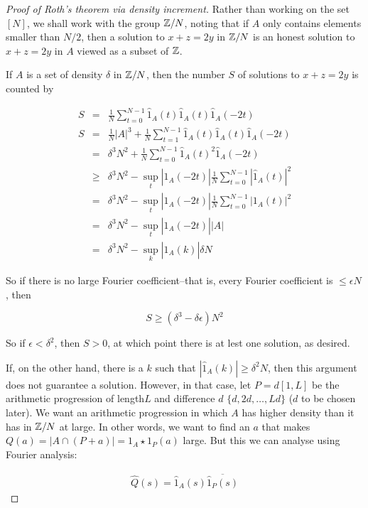 \documentclass{report}
\theoremstyle{remark}
\numberwithin{equation}{section}
\begin{document}
\begin{proof}[Proof of Roth's theorem via density increment]

  Rather than working on the set $[N]$, we shall work with the group
  $\mathbb{Z}/N$, noting that if $A$ only contains elements smaller than
  $N/2$, then a solution to $x+z=2y$ in $\mathbb{Z}/N$ is an honest solution
  to $x+z=2y$ in $A$ viewed as a subset of $\mathbb{Z}$.  

  If $A$ is a set of density $\delta$ in $\mathbb{Z}/N$, then the number $S$
  of solutions to $x+z=2y$ is counted by

  \begin{eqnarray*}
    S &=& \frac1N \sum_{t=0}^{N-1} \hat 1_A(t)\hat 1_A(t)\hat 1_A(-2t) \\
    S &=& \frac1N |A|^3 + \frac1N \sum_{t=1}^{N-1} \hat 1_A(t)\hat 1_A(t)\hat 1_A(-2t) \\
      &=& \delta^3 N^2 + \frac1N \sum_{t=0}^{N-1} \hat 1_A(t)^2\hat 1_A(-2t) \\
      &\geq& \delta^3 N^2 - \sup_t |\hat 1_A(-2t)| \frac1N \sum_{t=0}^{N-1} |\hat 1_A(t)|^2 \\
      &=& \delta^3 N^2 - \sup_t |\hat 1_A(-2t)| \frac1N \sum_{t=0}^{N-1} |1_A(t)|^2 \\
      &=& \delta^3 N^2 - \sup_t |\hat 1_A(-2t)| |A|\\
      &=& \delta^3 N^2 - \sup_k |\hat 1_A(k)| \delta N
  \end{eqnarray*}

  So if there is no large Fourier coefficient--that is, every Fourier
  coefficient is $\leq \epsilon N$, then
  
  \[S \geq (\delta^3 - \delta\epsilon) N^2\]

  So if $\epsilon < \delta^2$, then $S > 0$, at which point there is at
  lest one solution, as desired.  
  
  If, on the other hand, there is a $k$ such that
  $|\hat 1_A(k)| \geq \delta^2 N$, then this argument does not
  guarantee a solution.  However, in that case, let $P = d[1,L]$ be
  the arithmetic progression of length$L$ and difference $d$
  $\{d, 2d, \ldots ,Ld\}$ ($d$ to be chosen later).  We want an
  arithmetic progression in which $A$ has higher density than it has
  in $\mathbb{Z}/N$ at large.  In other words, we want to find an $a$ that
  makes $Q(a) = |A \cap (P+a)| = 1_A \star 1_P(a)$ large.  But this we
  can analyse using Fourier analysis:
  
  \begin{eqnarray*}
    \hat Q(s) = \hat 1_A(s) \overline{\hat 1_P(s)}
  \end{eqnarray*}
  

\end{proof}
\end{document}
